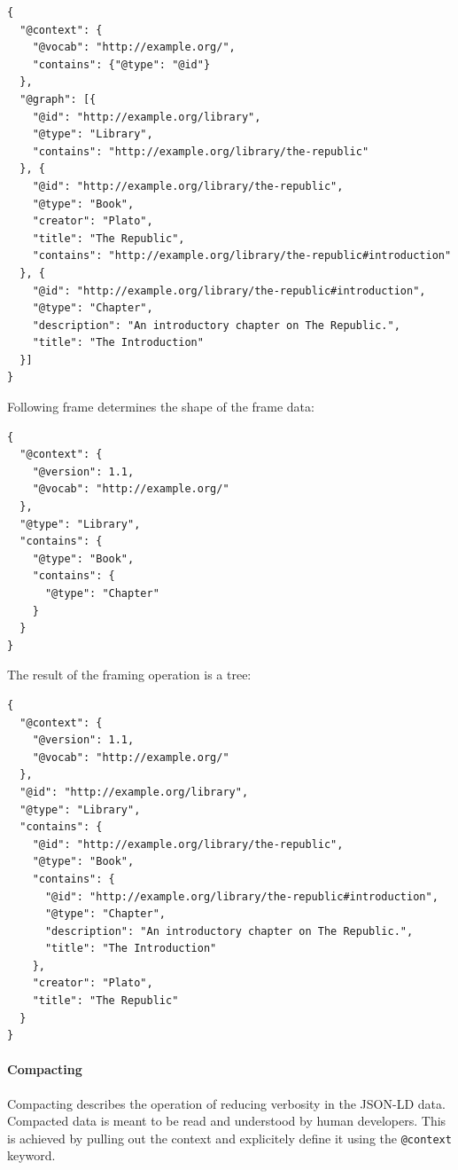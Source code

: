 \lstset{language=JSON}
\begin{lstlisting}[caption=Data of a library as normalized graph]
{
  "@context": {
    "@vocab": "http://example.org/",
    "contains": {"@type": "@id"}
  },
  "@graph": [{
    "@id": "http://example.org/library",
    "@type": "Library",
    "contains": "http://example.org/library/the-republic"
  }, {
    "@id": "http://example.org/library/the-republic",
    "@type": "Book",
    "creator": "Plato",
    "title": "The Republic",
    "contains": "http://example.org/library/the-republic#introduction"
  }, {
    "@id": "http://example.org/library/the-republic#introduction",
    "@type": "Chapter",
    "description": "An introductory chapter on The Republic.",
    "title": "The Introduction"
  }]
}
\end{lstlisting}

Following frame determines the shape of the frame data:

\lstset{language=JSON}
\begin{lstlisting}[caption=Frame for the framing operation]
{
  "@context": {
    "@version": 1.1,
    "@vocab": "http://example.org/"
  },
  "@type": "Library",
  "contains": {
    "@type": "Book",
    "contains": {
      "@type": "Chapter"
    }
  }
}
\end{lstlisting}

The result of the framing operation is a tree:

\lstset{language=JSON}
\begin{lstlisting}[caption=Framed data of a library]
{
  "@context": {
    "@version": 1.1,
    "@vocab": "http://example.org/"
  },
  "@id": "http://example.org/library",
  "@type": "Library",
  "contains": {
    "@id": "http://example.org/library/the-republic",
    "@type": "Book",
    "contains": {
      "@id": "http://example.org/library/the-republic#introduction",
      "@type": "Chapter",
      "description": "An introductory chapter on The Republic.",
      "title": "The Introduction"
    },
    "creator": "Plato",
    "title": "The Republic"
  }
}
\end{lstlisting}

\paragraph{Compacting}\label{jsonldcompacting}

Compacting describes the operation of reducing verbosity in the JSON-LD data. Compacted data is meant to be read and understood by human developers. This is achieved by pulling out the context and explicitely define it using the \lstinline{@context} keyword.

